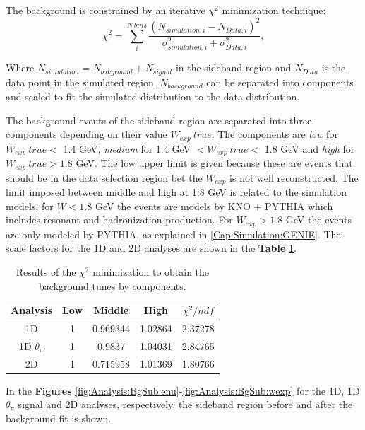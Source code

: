 The background is constrained by an iterative $\chi^2$ minimization technique:
\begin{equation}
    \chi^2=\sum^{N\ bins}_i \frac{\left(N_{simulation,i}-N_{Data,i}\right)^2}{\sigma^2_{simulation,i}+\sigma^2_{Data,i}},
\end{equation}

Where $N_{simulation}=N_{bakground}+N_{signal}$ in the sideband region and $N_{Data}$ is the data point in the simulated region. $N_{background}$  can be separated into components and scaled to fit the simulated distribution to the data distribution.  

The background events of the sideband region are separated into three components depending on their value $W_{exp}\ true$. The components are \textit{low} for $W_{exp}\ true<$ 1.4 GeV, \textit{ medium} for 1.4 GeV $<W_{exp}\ true< $ 1.8 GeV and \textit{high} for $W_{exp}\ true > 1.8$ GeV. The low upper limit is given because these are events that should be in the data selection region bet the $W_{exp}$ is not well reconstructed. The limit imposed between middle and high at 1.8 GeV is related to the simulation models, for $W < 1.8$ GeV the events are models by KNO + PYTHIA which includes resonant and hadronization production. For $W_{exp} > 1.8$ GeV the events are only modeled by PYTHIA, as explained in \ref{Cap:Simulation:GENIE}. The scale factors for the 1D and 2D analyses are shown in the \textbf{Table} \ref{tab:BgStudies:SidebandTunning:BGtunes}.

\begin{table}[!htb]
    \centering
    \begin{tabular}{c|c|c|c|c}
         Analysis & Low & Middle   &   High  & $\chi^2/ndf$ \\ \hline
         1D       & 1   & 0.969344 & 1.02864 & 2.37278 \\
         1D $\theta_\pi$& 1 & 0.9837 & 1.04031 & 2.84765 \\
         2D  & 1 &  0.715958 & 1.01369  & 1.80766
    \end{tabular}
    \caption{Results of the $\chi^2$ minimization to obtain the background tunes by components.}
    \label{tab:BgStudies:SidebandTunning:BGtunes}
\end{table}

In the \textbf{Figures} \ref{fig:Analysis:BgSub:enu}-\ref{fig:Analysis:BgSub:wexp} for the 1D, 1D $\theta_\pi$ signal and 2D analyses, respectively, the sideband region before and after the background fit is shown. 

